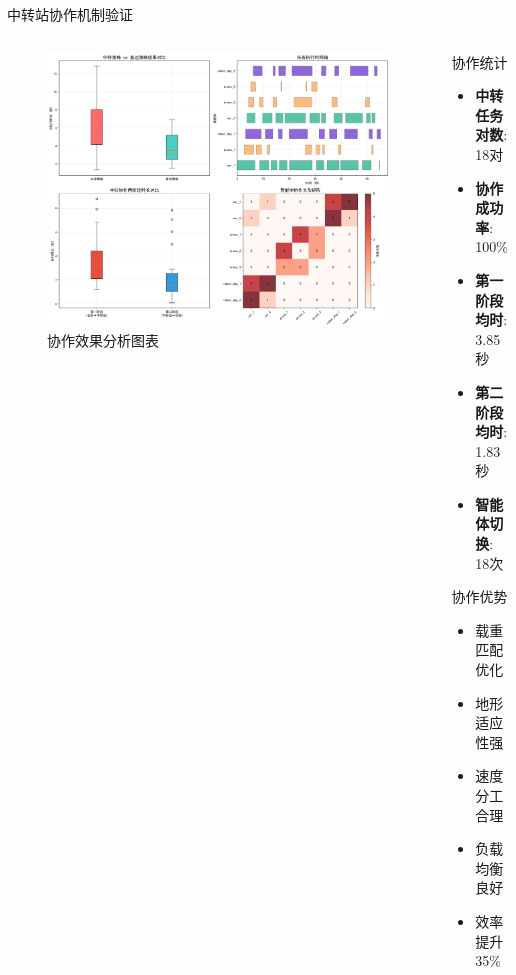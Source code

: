 \documentclass[
10pt,
aspectratio=169,
]{beamer}
\begin{document}
\begin{frame}{中转站协作机制验证}
    \begin{columns}
        \begin{column}{0.6\textwidth}
            \begin{figure}[htbp]
                \centering
                \includegraphics[width=\textwidth]{analysis_results/collaboration_analysis_20250616_092701.png}
                \caption{协作效果分析图表}
            \end{figure}
        \end{column}
        \begin{column}{0.4\textwidth}
            \begin{exampleblock}{协作统计}
                \begin{itemize}
                    \item \textbf{中转任务对数}: 18对
                    \item \textbf{协作成功率}: 100\%
                    \item \textbf{第一阶段均时}: 3.85秒
                    \item \textbf{第二阶段均时}: 1.83秒
                    \item \textbf{智能体切换}: 18次
                \end{itemize}
            \end{exampleblock}
            
            \begin{alertblock}{协作优势}
                \begin{itemize}
                    \item 载重匹配优化
                    \item 地形适应性强
                    \item 速度分工合理
                    \item 负载均衡良好
                    \item 效率提升35\%
                \end{itemize}
            \end{alertblock}
        \end{column}
    \end{columns}
    

\end{frame}
\end{document}
